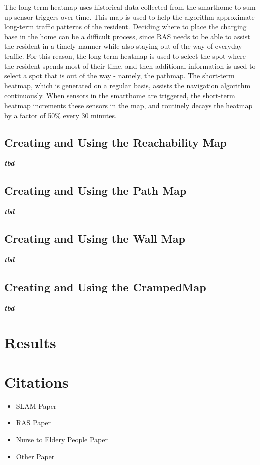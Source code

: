 \documentclass[11pt, conference, a4paper]{IEEEtran}
\begin{document}
The long-term heatmap uses historical data collected from the smarthome to sum up sensor triggers over time. This map is used to help the algorithm approximate long-term traffic patterns of the resident. Deciding where to place the charging base in the home can be a difficult process, since RAS needs to be able to assist the resident in a timely manner while also staying out of the way of everyday traffic. For this reason, the long-term heatmap is used to select the spot where the resident spends most of their time, and then additional information is used to select a spot that is out of the way - namely, the pathmap. 
The short-term heatmap, which is generated on a regular basis, assists the navigation algorithm continuously. When sensors in the smarthome are triggered, the short-term heatmap increments these sensors in the map, and routinely decays the heatmap by a factor of 50\% every 30 minutes. 


\subsection{Creating and Using the Reachability Map}
\textit{\textbf{tbd}} 


\subsection{Creating and Using the Path Map}
\textit{\textbf{tbd}}


\subsection{Creating and Using the Wall Map}
\textit{\textbf{tbd}}


\subsection{Creating and Using the CrampedMap}
\textit{\textbf{tbd}}


\section{Results}


\section{Citations}
\begin{itemize}
    \item SLAM Paper
    \item RAS Paper
    \item Nurse to Eldery People Paper
    \item Other Paper
\end{itemize}
\end{document}
